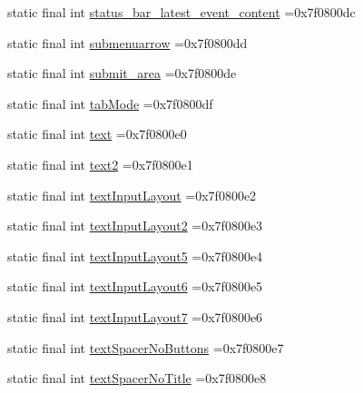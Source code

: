 \begin{DoxyCompactItemize}
static final int \mbox{\hyperlink{classbr_1_1unb_1_1cic_1_1mp_1_1marketmaster_1_1R_1_1id_adfccd09d0b842a4c5399434b25e67f44}{status\+\_\+bar\+\_\+latest\+\_\+event\+\_\+content}} =0x7f0800dc
\item 
static final int \mbox{\hyperlink{classbr_1_1unb_1_1cic_1_1mp_1_1marketmaster_1_1R_1_1id_a3f246c994ae8cd9516a1f9f22e79eeba}{submenuarrow}} =0x7f0800dd
\item 
static final int \mbox{\hyperlink{classbr_1_1unb_1_1cic_1_1mp_1_1marketmaster_1_1R_1_1id_a65d0c17fc77742392a52be759f7b473c}{submit\+\_\+area}} =0x7f0800de
\item 
static final int \mbox{\hyperlink{classbr_1_1unb_1_1cic_1_1mp_1_1marketmaster_1_1R_1_1id_aa15793266a5d0e821b2e09f16377c0fb}{tab\+Mode}} =0x7f0800df
\item 
static final int \mbox{\hyperlink{classbr_1_1unb_1_1cic_1_1mp_1_1marketmaster_1_1R_1_1id_a7d22a7cf4585a8caf863de0a7658975f}{text}} =0x7f0800e0
\item 
static final int \mbox{\hyperlink{classbr_1_1unb_1_1cic_1_1mp_1_1marketmaster_1_1R_1_1id_a31c034799aa44c5421477a7f5a90ad08}{text2}} =0x7f0800e1
\item 
static final int \mbox{\hyperlink{classbr_1_1unb_1_1cic_1_1mp_1_1marketmaster_1_1R_1_1id_a201a27aa7e6ea9c5b5110cf402d996f8}{text\+Input\+Layout}} =0x7f0800e2
\item 
static final int \mbox{\hyperlink{classbr_1_1unb_1_1cic_1_1mp_1_1marketmaster_1_1R_1_1id_af09eb1437d3bffe2f5b7b1e0c7d69c26}{text\+Input\+Layout2}} =0x7f0800e3
\item 
static final int \mbox{\hyperlink{classbr_1_1unb_1_1cic_1_1mp_1_1marketmaster_1_1R_1_1id_a54fa1835c1e92984a8a0468c4ef5894b}{text\+Input\+Layout5}} =0x7f0800e4
\item 
static final int \mbox{\hyperlink{classbr_1_1unb_1_1cic_1_1mp_1_1marketmaster_1_1R_1_1id_ae9565d557199af98f543deba012b5f02}{text\+Input\+Layout6}} =0x7f0800e5
\item 
static final int \mbox{\hyperlink{classbr_1_1unb_1_1cic_1_1mp_1_1marketmaster_1_1R_1_1id_ae6dc50a93e4cad6f0fe2ca5a37493352}{text\+Input\+Layout7}} =0x7f0800e6
\item 
static final int \mbox{\hyperlink{classbr_1_1unb_1_1cic_1_1mp_1_1marketmaster_1_1R_1_1id_a63c20d466bc2e8f23bd9f1af46ac55b0}{text\+Spacer\+No\+Buttons}} =0x7f0800e7
\item 
static final int \mbox{\hyperlink{classbr_1_1unb_1_1cic_1_1mp_1_1marketmaster_1_1R_1_1id_ae4e7277ddc91909364eed701be0bed60}{text\+Spacer\+No\+Title}} =0x7f0800e8

\end{DoxyCompactItemize}
